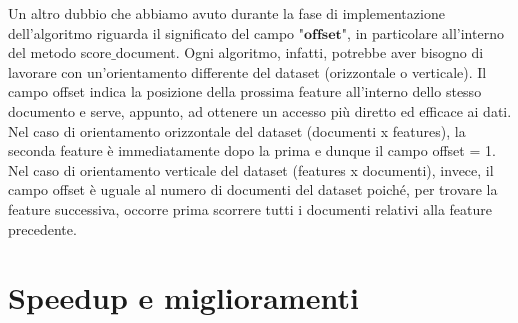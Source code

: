Un altro dubbio che abbiamo avuto durante la fase di implementazione dell'algoritmo riguarda il significato del campo "$\textbf{offset}$", in particolare all'interno del metodo score$\_$document. Ogni algoritmo, infatti, potrebbe aver bisogno di lavorare con un'orientamento differente del dataset (orizzontale o verticale). Il campo offset indica la posizione della prossima feature all'interno dello stesso documento e serve, appunto, ad ottenere un accesso più diretto ed efficace ai dati. Nel caso di orientamento orizzontale del dataset (documenti x features), la seconda feature è immediatamente dopo la prima e dunque il campo offset = 1. Nel caso di orientamento verticale del dataset (features x documenti), invece, il campo offset è uguale al numero di documenti del dataset poiché, per trovare la feature successiva, occorre prima scorrere tutti i documenti relativi alla feature precedente.
		
	\section*{Speedup e miglioramenti}
	
	
	
	
	

